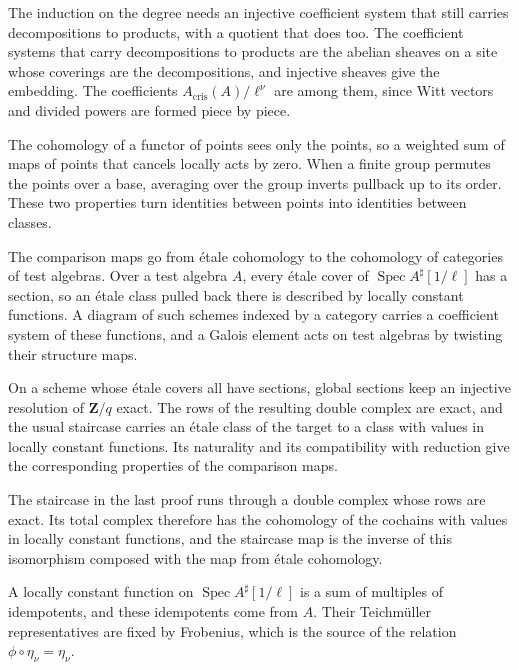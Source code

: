 The induction on the degree needs an injective coefficient system that still carries decompositions to
products, with a quotient that does too. The coefficient systems that carry decompositions to products
are the abelian sheaves on a site whose coverings are the decompositions, and injective sheaves give
the embedding. The coefficients $A_{\mathrm{cris}}(A)/\ell^\nu$ are among them, since Witt vectors and
divided powers are formed piece by piece.

The cohomology of a functor of points sees only the points, so a weighted sum of maps of points that
cancels locally acts by zero. When a finite group permutes the points over a base, averaging over the
group inverts pullback up to its order. These two properties turn identities between points into
identities between classes.

The comparison maps go from \'etale cohomology to the cohomology of categories of test algebras. Over a
test algebra $A$, every \'etale cover of $\operatorname{Spec}A^\sharp[1/\ell]$ has a section, so an
\'etale class pulled back there is described by locally constant functions. A diagram of such schemes
indexed by a category carries a coefficient system of these functions, and a Galois element acts on test
algebras by twisting their structure maps.

On a scheme whose \'etale covers all have sections, global sections keep an injective resolution of
$\mathbf Z/q$ exact. The rows of the resulting double complex are exact, and the usual staircase carries an
\'etale class of the target to a class with values in locally constant functions. Its naturality and its
compatibility with reduction give the corresponding properties of the comparison maps.

The staircase in the last proof runs through a double complex whose rows are exact. Its total complex
therefore has the cohomology of the cochains with values in locally constant functions, and the staircase
map is the inverse of this isomorphism composed with the map from \'etale cohomology.

A locally constant function on $\operatorname{Spec}A^\sharp[1/\ell]$ is a sum of multiples of
idempotents, and these idempotents come from $A$. Their Teichm\"uller representatives are fixed by
Frobenius, which is the source of the relation $\phi\circ\eta_\nu=\eta_\nu$.

